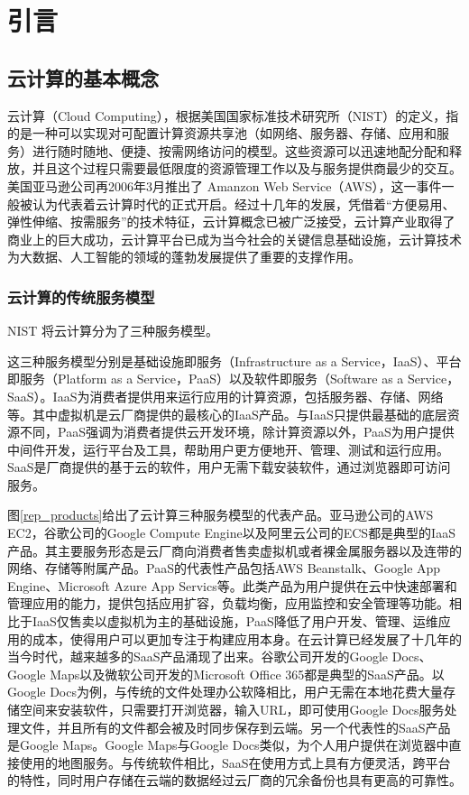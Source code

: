
\chapter{引言}

\section{云计算的基本概念}

云计算（Cloud Computing），根据美国国家标准技术研究所（NIST）的定义，指的是一种可以实现对可配置计算资源共享池（如网络、服务器、存储、应用和服务）进行随时随地、便捷、按需网络访问的模型。这些资源可以迅速地配分配和释放，并且这个过程只需要最低限度的资源管理工作以及与服务提供商最少的交互。美国亚马逊公司再2006年3月推出了 Amanzon Web Service（AWS）\parencite{aws}，这一事件一般被认为代表着云计算时代的正式开启。经过十几年的发展，凭借着“方便易用、弹性伸缩、按需服务”的技术特征，云计算概念已被广泛接受，云计算产业取得了商业上的巨大成功，云计算平台已成为当今社会的关键信息基础设施，云计算技术为大数据、人工智能的领域的蓬勃发展提供了重要的支撑作用。

\subsection{云计算的传统服务模型}

NIST 将云计算分为了三种服务模型。

这三种服务模型分别是基础设施即服务（Infrastructure as a Service，IaaS）、平台即服务（Platform as a Service，PaaS）以及软件即服务（Software as a Service，SaaS）\parencite{mell2011the}。IaaS为消费者提供用来运行应用的计算资源，包括服务器、存储、网络等。其中虚拟机是云厂商提供的最核心的IaaS产品。与IaaS只提供最基础的底层资源不同，PaaS强调为消费者提供云开发环境，除计算资源以外，PaaS为用户提供中间件开发，运行平台及工具，帮助用户更方便地开、管理、测试和运行应用。SaaS是厂商提供的基于云的软件，用户无需下载安装软件，通过浏览器即可访问服务。

图\ref{rep_products}给出了云计算三种服务模型的代表产品。亚马逊公司的AWS EC2\parencite{awsec2}，谷歌公司的Google Compute Engine\parencite{googlecloud}以及阿里云公司的ECS\parencite{aliecs}都是典型的IaaS产品。其主要服务形态是云厂商向消费者售卖虚拟机或者裸金属服务器以及连带的网络、存储等附属产品。PaaS的代表性产品包括AWS Beanstalk、Google App Engine、Microsoft Azure App Servics等。此类产品为用户提供在云中快速部署和管理应用的能力，提供包括应用扩容，负载均衡，应用监控和安全管理等功能。相比于IaaS仅售卖以虚拟机为主的基础设施，PaaS降低了用户开发、管理、运维应用的成本，使得用户可以更加专注于构建应用本身。在云计算已经发展了十几年的当今时代，越来越多的SaaS产品涌现了出来。谷歌公司开发的Google Docs、Google Maps以及微软公司开发的Microsoft Office 365都是典型的SaaS产品。以Google Docs为例，与传统的文件处理办公软降相比，用户无需在本地花费大量存储空间来安装软件，只需要打开浏览器，输入URL，即可使用Google Docs服务处理文件，并且所有的文件都会被及时同步保存到云端。另一个代表性的SaaS产品是Google Maps。Google Maps与Google Docs类似，为个人用户提供在浏览器中直接使用的地图服务。与传统软件相比，SaaS在使用方式上具有方便灵活，跨平台的特性，同时用户存储在云端的数据经过云厂商的冗余备份也具有更高的可靠性。

